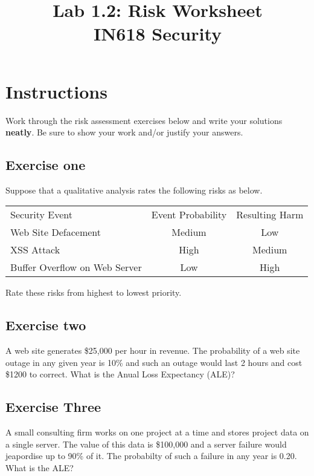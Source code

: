 \documentclass{article}
\begin{document}
\title{Lab 1.2: Risk Worksheet\\ IN618 Security}
\date{}
\maketitle

\section*{Instructions}
Work through the risk assessment exercises below and write your solutions \textbf{neatly}.  Be sure to show your work and/or justify your answers.

\subsection*{Exercise one}
Suppose that a qualitative analysis rates the following risks as below.

\vspace{5mm}

\begin{tabular}{l c c}
	Security Event & Event Probability & Resulting Harm \\
	Web Site Defacement & Medium & Low \\
	XSS Attack & High & Medium \\
	Buffer Overflow on Web Server & Low & High \\

\end{tabular}

Rate these risks from highest to lowest priority.

\vspace{25mm}

\subsection*{Exercise two}
A web site generates \$25,000 per hour in revenue. The probability of a web site outage in any given year is 10\% and such an outage would last 2 hours and cost \$1200 to correct. What is the Anual Loss Expectancy (ALE)?

\newpage

\subsection*{Exercise Three}
A small consulting firm works on one project at a time and stores project data on a single server. The value of this data is \$100,000 and a server failure would jeapordise up to 90\% of it. The probabilty of such a failure in any year is 0.20.  What is the ALE?
\end{document}
